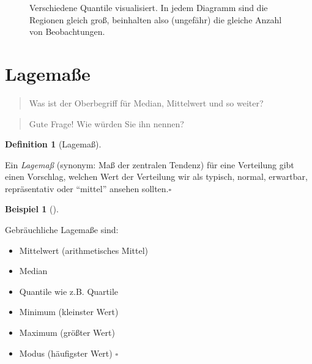 \documentclass[
  letterpaper,
]{scrbook}
\providecommand{\tightlist}{%
  \setlength{\itemsep}{0pt}\setlength{\parskip}{0pt}}\usepackage{longtable,booktabs,array}
\theoremstyle{definition}
\newtheorem{example}{Beispiel}[chapter]
\theoremstyle{definition}
\newtheorem{definition}{Definition}[chapter]
\theoremstyle{definition}
\theoremstyle{remark}
\begin{document}
\begin{figure}
\begin{minipage}{0.33\linewidth}
{}


\end{minipage}%

\caption{\label{fig-quantile-mosaic}Verschiedene Quantile visualisiert.
In jedem Diagramm sind die Regionen gleich groß, beinhalten also
(ungefähr) die gleiche Anzahl von Beobachtungen.}

\end{figure}%

\section{Lagemaße}\label{sec-lage}

\begin{quote}
{} Was ist der Oberbegriff für Median, Mittelwert und so
weiter?
\end{quote}

\begin{quote}
{} Gute Frage! Wie würden Sie ihn nennen?
\end{quote}

\begin{definition}[Lagemaß]\protect\hypertarget{def-lage}{}\label{def-lage}

Ein \emph{Lagemaß} (synonym: Maß der zentralen Tendenz) für eine
Verteilung gibt einen Vorschlag, welchen Wert der Verteilung wir als
typisch, normal, erwartbar, repräsentativ oder ``mittel'' ansehen
sollten.\(\square\)

\end{definition}

\begin{example}[]\protect\hypertarget{exm-lagemaße}{}\label{exm-lagemaße}

Gebräuchliche Lagemaße sind:

\begin{itemize}
\tightlist
\item
  Mittelwert (arithmetisches Mittel)
\item
  Median
\item
  Quantile wie z.B. Quartile
\item
  Minimum (kleinster Wert)
\item
  Maximum (größter Wert)
\item
  Modus (häufigster Wert) \(\square\)
\end{itemize}

\end{example}
\end{document}
